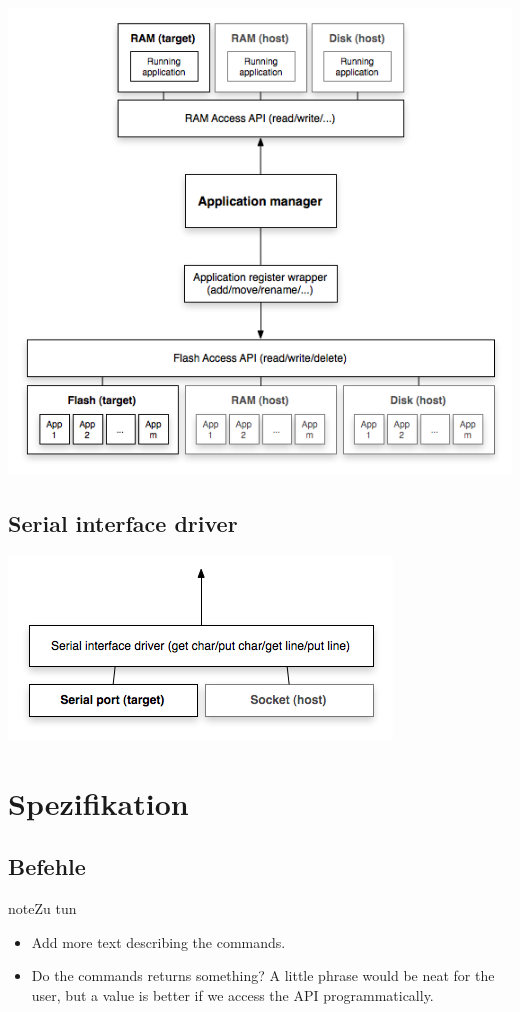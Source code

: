 \documentclass[letterpaper,10pt,ngerman]{manual}
\begin{document}
\includegraphics{app-manager.png}


\section{Serial interface driver}

\includegraphics{serial-driver.png}

\resetcurrentobjects
\hypertarget{--doc-specification/index}{}

\chapter{Spezifikation}

\resetcurrentobjects
\hypertarget{--doc-specification/commands}{}

\section{Befehle}
\hypertarget{todo-19}{}
\begin{notice}{note}{Zu tun}
\begin{itemize}
\item {} 
Add more text describing the commands.

\item {} 
Do the commands returns something? A little phrase would be neat for the
user, but a value is better if we access the API programmatically.

\end{itemize}
\end{notice}
\end{document}
